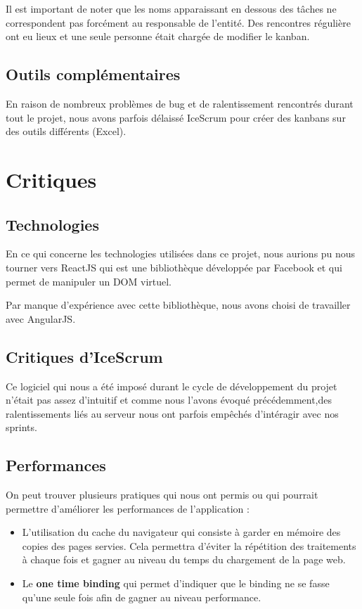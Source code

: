 \documentclass [a4paper,11pt]{article}
\begin{document}
Il est important de noter que les noms apparaissant en dessous des tâches ne correspondent pas forcément au responsable de l'entité. Des rencontres régulière ont eu lieux et une seule personne était chargée de modifier le kanban.

\subsection{Outils complémentaires}
En raison de nombreux problèmes de bug et de ralentissement rencontrés durant tout le projet, nous avons parfois délaissé IceScrum pour créer des kanbans sur des outils différents (Excel). 

\newpage

\section{Critiques}

\subsection{Technologies}
En ce qui concerne les technologies utilisées dans ce projet, nous aurions pu nous tourner vers ReactJS qui est une bibliothèque développée par Facebook et qui permet de manipuler un DOM virtuel.
\newline

Par manque d'expérience avec cette bibliothèque, nous avons choisi de travailler avec AngularJS.

\subsection{Critiques d'IceScrum}
Ce logiciel qui nous a été imposé durant le cycle de développement du projet n'était pas assez d'intuitif et comme nous l'avons évoqué précédemment,des ralentissements liés au serveur nous ont parfois empêchés d'intéragir avec nos sprints.

\subsection{Performances}
On peut trouver plusieurs pratiques qui nous ont permis ou qui pourrait permettre d’améliorer les performances de l’application :
\newline

\begin{itemize}
\item L’utilisation du cache du navigateur qui consiste à garder en mémoire des copies des pages servies. Cela permettra d’éviter la répétition des traitements à chaque fois et gagner au niveau du temps du chargement de la page web.\newline
\item Le \textbf{one time binding} qui permet d’indiquer que le binding ne se fasse qu’une seule fois afin de gagner au niveau performance.
\end{itemize}
\end{document}
